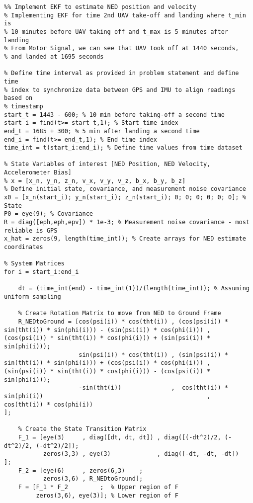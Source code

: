 \begin{lstlisting}
%% Implement EKF to estimate NED position and velocity
% Implementing EKF for time 2nd UAV take-off and landing where t_min is 
% 10 minutes before UAV taking off and t_max is 5 minutes after landing
% From Motor Signal, we can see that UAV took off at 1440 seconds,
% and landed at 1695 seconds

% Define time interval as provided in problem statement and define time
% index to synchronize data between GPS and IMU to align readings based on
% timestamp
start_t = 1443 - 600; % 10 min before taking-off a second time
start_i = find(t>= start_t,1); % Start time index
end_t = 1685 + 300; % 5 min after landing a second time
end_i = find(t>= end_t,1); % End time index
time_int = t(start_i:end_i); % Define time values from time dataset

% State Variables of interest [NED Position, NED Velocity, Accelerometer Bias]
% x = [x_n, y_n, z_n, v_x, v_y, v_z, b_x, b_y, b_z]
% Define initial state, covariance, and measurement noise covariance
x0 = [x_n(start_i); y_n(start_i); z_n(start_i); 0; 0; 0; 0; 0; 0]; % State
P0 = eye(9); % Covariance
R = diag([eph,eph,epv]) * 1e-3; % Measurement noise covariance - most reliable is GPS
x_hat = zeros(9, length(time_int)); % Create arrays for NED estimate coordinates

% System Matrices
for i = start_i:end_i
    
    dt = (time_int(end) - time_int(1))/(length(time_int)); % Assuming uniform sampling

    % Create Rotation Matrix to move from NED to Ground Frame
    R_NEDtoGround = [cos(psi(i)) * cos(tht(i)) , (cos(psi(i)) * sin(tht(i)) * sin(phi(i))) - (sin(psi(i)) * cos(phi(i))) , (cos(psi(i)) * sin(tht(i)) * cos(phi(i))) + (sin(psi(i)) * sin(phi(i)));
                     sin(psi(i)) * cos(tht(i)) , (sin(psi(i)) * sin(tht(i)) * sin(phi(i))) + (cos(psi(i)) * cos(phi(i))) , (sin(psi(i)) * sin(tht(i)) * cos(phi(i))) - (cos(psi(i)) * sin(phi(i)));
                     -sin(tht(i))              ,  cos(tht(i)) * sin(phi(i))                                              ,  cos(tht(i)) * cos(phi(i))                                            ];
    
    % Create the State Transition Matrix
    F_1 = [eye(3)     , diag([dt, dt, dt]) , diag([(-dt^2)/2, (-dt^2)/2, (-dt^2)/2]);
           zeros(3,3) , eye(3)             , diag([-dt, -dt, -dt])                 ];
    F_2 = [eye(6)     , zeros(6,3)    ;
           zeros(3,6) , R_NEDtoGround];
    F = [F_1 * F_2         ;  % Upper region of F
         zeros(3,6), eye(3)]; % Lower region of F


\end{lstlisting}
